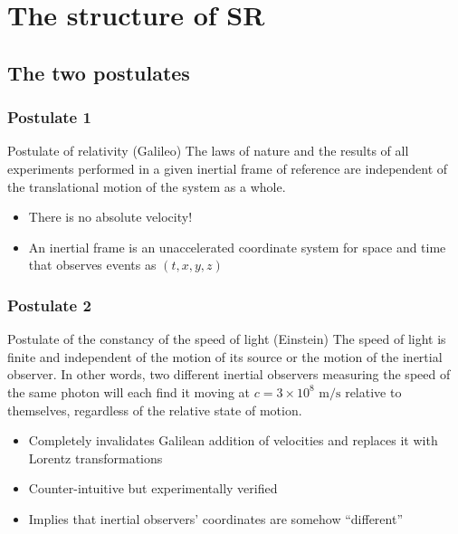 \documentclass{beamer}
\begin{document}
\section{The structure of SR}

\subsection{The two postulates}

\begin{frame}
    \frametitle{Postulate 1}
    \begin{block}{Postulate of relativity (Galileo)}
        The laws of nature and the results of all experiments performed in a given
        inertial frame of reference are independent of the translational motion
        of the system as a whole.
    \end{block}

    \begin{itemize}
        \item There is no absolute velocity!
        \item An inertial frame is an unaccelerated coordinate system for space and time that observes events as $(t,x,y,z)$ 
    \end{itemize}
\end{frame}

\begin{frame}
    \frametitle{Postulate 2}
    \begin{block}{Postulate of the constancy of the speed of light (Einstein)}
        The speed of light is finite and independent of the motion of its source
        or the motion of the inertial observer. In other words, two different
        inertial observers measuring the speed of the same photon will each find
        it moving at $c=3\times 10^8\text{ m/s}$ relative to themselves, regardless
        of the relative state of motion.
    \end{block}
    \begin{itemize}
        \item Completely invalidates Galilean addition of velocities and replaces
            it with Lorentz transformations
        \item Counter-intuitive but experimentally verified
        \item Implies that inertial observers' coordinates are somehow ``different''
    \end{itemize}
\end{frame}
\end{document}

